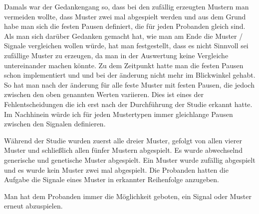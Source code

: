 
Damals war der Gedankengang so, dass bei den zuf{\"a}llig erzeugten Mustern man vermeiden wollte, dass Muster zwei mal abgespielt werden und aus dem Grund habe man sich die festen Pausen definiert, die f{\"u}r jeden Probanden gleich sind.
Als man sich dar{\"u}ber Gedanken gemacht hat, wie man am Ende die Muster / Signale vergleichen wollen w{\"u}rde, hat man festgestellt, dass es nicht Sinnvoll sei zuf{\"a}llige Muster zu erzeugen, da man in der Auswertung keine Vergleiche untereinander machen k{\"o}nnte.
Zu dem Zeitpunkt hatte man die festen Pausen schon implementiert und und bei der {\"a}nderung nicht mehr im Blickwinkel gehabt. So hat man nach der {\"a}nderung f{\"u}r alle feste Muster mit festen Pausen, die jedoch zwischen den oben genannten Werten variieren. 
Dies ist eines der Fehlentscheidungen die ich erst nach der Durchf{\"u}hrung der Studie erkannt hatte. Im Nachhinein w{\"u}rde ich f{\"u}r jeden Mustertypen immer gleichlange Pausen zwischen den Signalen definieren.

W{\"a}hrend der Studie wurden zuerst alle dreier Muster, gefolgt von allen vierer Muster und schlie{\ss}lich allen f{\"u}nfer Mustern abgespielt.
Es wurde abwechselnd generische und genetische Muster abgespielt. Ein Muster wurde zuf{\"a}llig abgespielt und es wurde kein Muster zwei mal abgespielt. 
Die Probanden hatten die Aufgabe die Signale eines Muster in erkannter Reihenfolge anzugeben. 

Man hat dem Probanden immer die M{\"o}glichkeit geboten, ein Signal oder Muster erneut abzuspielen.
